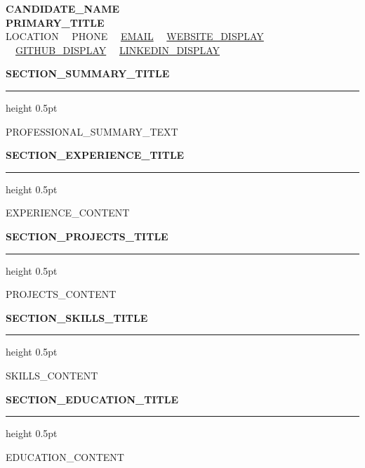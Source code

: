 \documentclass[10pt,letterpaper]{article}
\newcommand{\resumesection}[1]{%
  \vspace{2pt}%
  {\color{primary}\normalsize\bfseries\MakeUppercase{#1}}%
  \vspace{1pt}\hrule height 0.5pt\vspace{2pt}%
}
\begin{document}
\color{textdark}

\begin{center}
    {\LARGE \textbf{\color{primary} {{CANDIDATE_NAME}}}} \\ \vspace{1.5pt}
    {\large \textbf{{{PRIMARY_TITLE}}}} \\ \vspace{2pt}
    {\small
        {{LOCATION}} \ \textbullet \
        {{PHONE}} \ \textbullet \
        \href{mailto:{{EMAIL}}}{{{EMAIL}}} \ \textbullet \
        \href{{{WEBSITE}}}{{{WEBSITE_DISPLAY}}} \ \textbullet \
        \href{{{GITHUB}}}{{{GITHUB_DISPLAY}}} \ \textbullet \
        \href{{{LINKEDIN}}}{{{LINKEDIN_DISPLAY}}}
    }
\end{center}

\vspace{-6pt}

\resumesection{{{SECTION_SUMMARY_TITLE}}}
{\small {{PROFESSIONAL_SUMMARY_TEXT}}}

\resumesection{{{SECTION_EXPERIENCE_TITLE}}}
{{EXPERIENCE_CONTENT}}

\resumesection{{{SECTION_PROJECTS_TITLE}}}
{{PROJECTS_CONTENT}}

\resumesection{{{SECTION_SKILLS_TITLE}}}
{{SKILLS_CONTENT}}

\resumesection{{{SECTION_EDUCATION_TITLE}}}
{{EDUCATION_CONTENT}}
\end{document}
